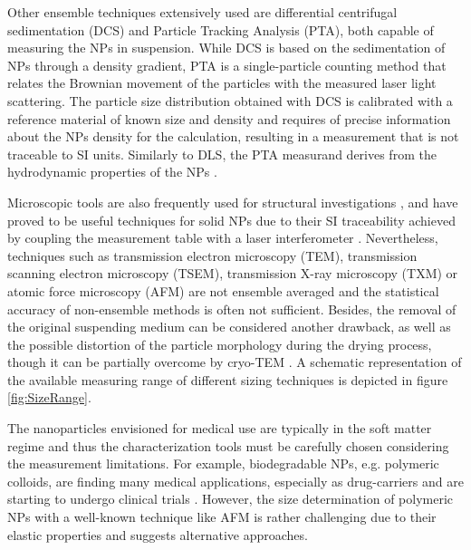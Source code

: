 Other ensemble techniques extensively used are differential centrifugal sedimentation (DCS) \citep{fielding_correcting_2012} and Particle Tracking Analysis (PTA), both capable of measuring the NPs in suspension. While DCS is based on the sedimentation of NPs through a density gradient, PTA is a single-particle counting method that relates the Brownian movement of the particles with the measured laser light scattering. The particle size distribution obtained with DCS is calibrated with a reference material of known size and density and requires of precise information about the NPs density for the calculation, resulting in a measurement that is not traceable to SI units. Similarly to DLS, the PTA measurand derives from the hydrodynamic properties of the NPs \citep{varga_towards_2014}.

Microscopic tools are also frequently used for structural investigations \citep{joensson_morphology_1991,silverstein_microstructure_1989}, and have proved to be useful techniques for solid NPs due to their SI traceability achieved by coupling the measurement table with a laser interferometer \citep{meli_traceable_2012}. Nevertheless, techniques such as transmission electron microscopy (TEM), transmission scanning electron microscopy (TSEM), transmission X-ray microscopy (TXM) or atomic force microscopy (AFM) are not ensemble averaged and the statistical accuracy of non-ensemble methods is often not sufficient. Besides, the removal of the original suspending medium can be considered another drawback, as well as the possible distortion of the particle morphology during the drying process, though it can be partially overcome by cryo-TEM \citep{li_doxorubicin_1998}. A schematic representation of the available measuring range of different sizing techniques is depicted in figure \ref{fig:SizeRange}.

\begin{figure*}[hbt]%
	\centering
	        \def\svgwidth{0.95\linewidth}
		
		\caption[Sizing techniques.]{Some available sizing techniques for nanoparticles and their measuring size range.}
		\label{fig:SizeRange}
\end{figure*}

The nanoparticles envisioned for medical use are typically in the soft matter regime and thus the characterization tools must be carefully chosen considering the measurement limitations. For example, biodegradable NPs, e.g. polymeric colloids, are finding many medical applications, especially as drug-carriers \citep{kattan_phase_1992,vicent_polymer_2006} and are starting to undergo clinical trials \citep{patel_polymeric_2012,beija_colloidal_2012,cabral_progress_2014}. However, the size determination of polymeric NPs with a well-known technique like AFM is rather challenging due to their elastic properties \citep{wu_particle_2014} and suggests alternative approaches.

